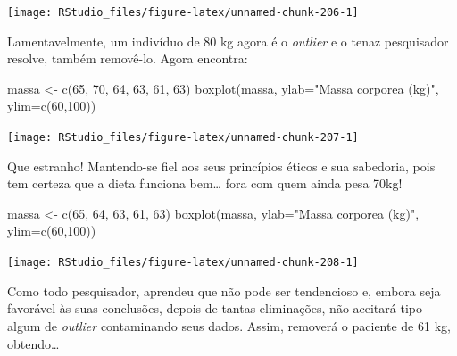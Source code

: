 \documentclass[
]{article}
\newenvironment{Shaded}{\begin{snugshade}}{\end{snugshade}}
\newcommand{\AttributeTok}[1]{\textcolor[rgb]{0.77,0.63,0.00}{#1}}
\newcommand{\DecValTok}[1]{\textcolor[rgb]{0.00,0.00,0.81}{#1}}
\newcommand{\FunctionTok}[1]{\textcolor[rgb]{0.00,0.00,0.00}{#1}}
\newcommand{\NormalTok}[1]{#1}
\newcommand{\OtherTok}[1]{\textcolor[rgb]{0.56,0.35,0.01}{#1}}
\newcommand{\StringTok}[1]{\textcolor[rgb]{0.31,0.60,0.02}{#1}}
\begin{document}
\begin{center}\texttt{[image: RStudio\_files/figure-latex/unnamed-chunk-206-1]} \end{center}

Lamentavelmente, um indivíduo de 80 kg agora é o \emph{outlier} e o
tenaz pesquisador resolve, também removê-lo. Agora encontra:

\begin{Shaded}
\begin{Highlighting}[]
\NormalTok{massa }\OtherTok{\textless{}{-}} \FunctionTok{c}\NormalTok{(}\DecValTok{65}\NormalTok{, }\DecValTok{70}\NormalTok{, }\DecValTok{64}\NormalTok{, }\DecValTok{63}\NormalTok{, }\DecValTok{61}\NormalTok{, }\DecValTok{63}\NormalTok{)}
\FunctionTok{boxplot}\NormalTok{(massa, }\AttributeTok{ylab=}\StringTok{"Massa corporea (kg)"}\NormalTok{, }\AttributeTok{ylim=}\FunctionTok{c}\NormalTok{(}\DecValTok{60}\NormalTok{,}\DecValTok{100}\NormalTok{))}
\end{Highlighting}
\end{Shaded}

\begin{center}\texttt{[image: RStudio\_files/figure-latex/unnamed-chunk-207-1]} \end{center}

Que estranho! Mantendo-se fiel aos seus princípios éticos e sua
sabedoria, pois tem certeza que a dieta funciona bem\ldots{} fora com
quem ainda pesa 70kg!

\begin{Shaded}
\begin{Highlighting}[]
\NormalTok{massa }\OtherTok{\textless{}{-}} \FunctionTok{c}\NormalTok{(}\DecValTok{65}\NormalTok{, }\DecValTok{64}\NormalTok{, }\DecValTok{63}\NormalTok{, }\DecValTok{61}\NormalTok{, }\DecValTok{63}\NormalTok{)}
\FunctionTok{boxplot}\NormalTok{(massa, }\AttributeTok{ylab=}\StringTok{"Massa corporea (kg)"}\NormalTok{, }\AttributeTok{ylim=}\FunctionTok{c}\NormalTok{(}\DecValTok{60}\NormalTok{,}\DecValTok{100}\NormalTok{))}
\end{Highlighting}
\end{Shaded}

\begin{center}\texttt{[image: RStudio\_files/figure-latex/unnamed-chunk-208-1]} \end{center}

Como todo pesquisador, aprendeu que não pode ser tendencioso e, embora
seja favorável às suas conclusões, depois de tantas eliminações, não
aceitará tipo algum de \emph{outlier} contaminando seus dados. Assim,
removerá o paciente de 61 kg, obtendo\ldots{}
\end{document}
